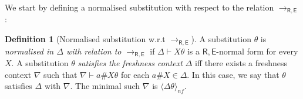 \documentclass[11pt,a4paper]{amsart}
\newcommand{\daniele}[1]{\textcolor{cyan}{#1}}
\newcommand{\alert}[1]{\textcolor{red}{#1}}
\newcommand{\dani}[1]{\textcolor{orange}{#1}}
\newcommand{\nfpair}[1]{\langle #1\rangle_{nf}}
\newcommand{\theory}[1]{\ensuremath{\mathsf{#1}}}
\theoremstyle{plain}
\theoremstyle{definition}
\newtheorem{definition}[theorem]{Definition}
\theoremstyle{remark}
\begin{document}
We start by defining a normalised substitution with respect to the relation $\to_{\theory{R,E}}$:
%

\begin{definition}[Normalised substitution w.r.t $\to_{\theory{R},\theory{E}}$]
A substitution $\theta$ is \emph{normalised in $\Delta$ with relation to $\to_{\theory{R,E}}$} if $\Delta \vdash X\theta$ is a $\theory{R,E}$-normal form  for every $X$. A substitution $\theta$ {\em satisfies the freshness context} $\Delta$ iff there exists a freshness context $\nabla$ such that $\nabla \vdash a\#X\theta$ for each $a\#X \in \Delta$. In this case, we say that $\theta$ satisfies $\Delta$ with $\nabla$. The minimal such $\nabla$ is $\nfpair{\Delta\theta}$.
\end{definition}


\end{document}
